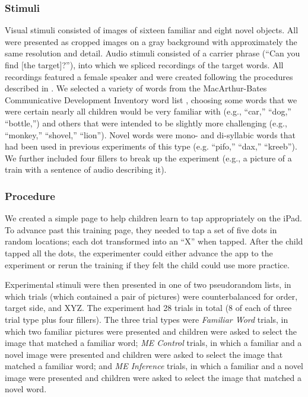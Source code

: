 \documentclass[man,noapacite]{apa2}
\begin{document}
\subsubsection{Stimuli}

Visual stimuli consisted of images of sixteen familiar and eight novel objects. All were presented as cropped images on a gray background with approximately the same resolution and detail.  Audio stimuli consisted of a carrier phrase (``Can you find [the target]?''), into which we spliced recordings of the target words. All recordings featured a female speaker and were created following the procedures described in . We selected a variety of words from the MacArthur-Bates Communicative Development Inventory word list \cite{fenson1994,fenson2007}, choosing some words that we were certain nearly all children would be very familiar with (e.g., ``car,'' ``dog,'' ``bottle,'') and others that were intended to be slightly more challenging (e.g., ``monkey,'' ``shovel,'' ``lion''). Novel words were mono- and di-syllabic words that had been used in previous experiments of this type (e.g. ``pifo,'' ``dax,'' ``kreeb''). We further included four fillers to break up the experiment (e.g., a picture of a train with a sentence of audio describing it).

\subsubsection{Procedure}

We created a simple page to help children learn to tap appropriately on the iPad. To advance past this training page, they needed to tap a set of five dots in random locations; each dot transformed into an ``X'' when tapped. After the child tapped all the dots, the experimenter could either advance the app to the experiment or rerun the training if they felt the child could use more practice. 

Experimental stimuli were then presented in one of two pseudorandom lists, in which trials (which contained a pair of pictures) were counterbalanced for order, target side, and XYZ. The experiment had 28 trials in total (8 of each of three trial type plus four fillers). The three trial types were \emph{Familiar Word} trials, in which two familiar pictures were presented and children were asked to select the image that matched a familiar word; \emph{ME Control} trials, in which a familiar and a novel image were presented and children were asked to select the image that matched a familiar word; and \emph{ME Inference} trials, in which a familiar and a novel image were presented and children were asked to select the image that matched a novel word. 
\end{document}
